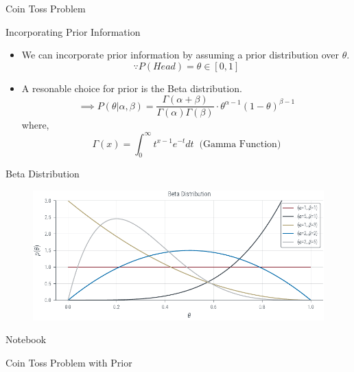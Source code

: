 \documentclass{beamer}
\begin{document}
\begin{section}{Coin Toss Problem}
    \begin{frame}{Incorporating Prior Information}
        \begin{itemize}
            \item We can incorporate prior information by assuming a prior distribution over $\theta$.
            \pause
            \begin{equation*}
                \because P(Head) = \theta \in \left[ 0, 1 \right]
            \end{equation*}
            \pause
            \item A resonable choice for prior is the Beta distribution.
            \pause
            \begin{equation*}
                \implies P(\theta | \alpha, \beta) = \frac{\Gamma (\alpha + \beta)}{\Gamma (\alpha) \Gamma (\beta)} \cdot \theta^{\alpha - 1} (1 - \theta)^{\beta - 1}
            \end{equation*}
            where,
            \begin{equation*}
                \Gamma (x) = \int_{0}^{\infty} t^{x - 1} e^{-t} dt \;\; \text{(Gamma Function)}
            \end{equation*}
            
        \end{itemize}
    \end{frame}

    \begin{frame}{Beta Distribution}
        \begin{figure}
            \centerline{\includegraphics[scale = 0.75]{../figures/map/beta_distribution.pdf}}
        \end{figure}

        Notebook
    \end{frame}

    \begin{frame}{Coin Toss Problem with Prior}
        \begin{tikzpicture}
                

\end{tikzpicture}
\end{frame}
\end{section}
\end{document}
